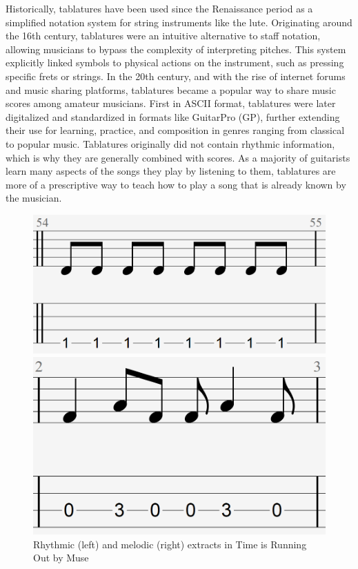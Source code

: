 Historically, tablatures have been used since the Renaissance period as a simplified notation system for string instruments like the lute.
Originating around the 16th century, tablatures were an intuitive alternative to staff notation, allowing musicians to bypass the complexity of interpreting pitches.
This system explicitly linked symbols to physical actions on the instrument, such as pressing specific frets or strings.
In the 20th century, and with the rise of internet forums and music sharing platforms, tablatures became a popular way to share music scores among amateur musicians.
First in ASCII format, tablatures were later digitalized and standardized in formats like GuitarPro (GP), further extending their use for learning, practice, and composition in genres ranging from classical to popular music\cite{sarmento_dadagp_2021}.
Tablatures originally did not contain rhythmic information, which is why they are generally combined with scores.
As a majority of guitarists learn many aspects of the songs they play by listening to them\cite{green_how_2001},
tablatures are more of a prescriptive way to teach how to play a song that is already known by the musician.


\begin{figure}[h!]
    \centering
    \begin{minipage}{0.45\textwidth}
        \centering
        \includegraphics[width=.5\linewidth]{../images-figures/rhythmic_tab_TIRO.png}
    \end{minipage}%
    \hfill
    \begin{minipage}{0.45\textwidth}
        \centering
        \includegraphics[width=.5\linewidth]{../images-figures/melodic_tab_TIRO.png}
    \end{minipage}
    \caption{Rhythmic (left) and melodic (right) extracts in Time is Running Out by Muse}
    \label{fig:bass_tab_TIRO}
\end{figure}


